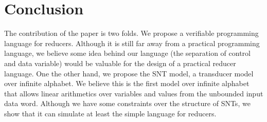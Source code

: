 	
\section{Conclusion}
\label{sec:conclusion}


The contribution of the paper is two folds. We propose a verifiable programming language for reducers. Although it is still far away from a practical programming language, we believe some idea behind our language (the separation of control and data variable) would be valuable for the design of a practical reducer language. One the other hand, we propose the SNT model, a transducer model over infinite alphabet. We believe this is the first model over infinite alphabet that allows linear arithmetics over variables and values from the unbounded input data word. Although we have some constraints over the structure of SNTs, we show that it can simulate at least the simple language for reducers. 



